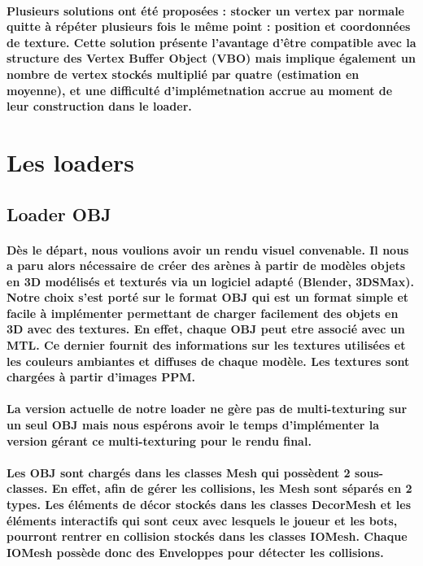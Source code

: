 \paragraph{Plusieurs solutions ont été proposées : stocker un vertex par normale quitte à répéter plusieurs fois le même point : position et coordonnées de texture. Cette solution présente l'avantage d'être compatible avec la structure des Vertex Buffer Object (VBO) mais implique également un nombre de vertex stockés multiplié par quatre (estimation en moyenne), et une difficulté d'implémetnation accrue au moment de leur construction dans le loader.}



\newpage
\section{Les loaders}
\subsection{Loader OBJ}
\vspace{0.5cm}

\paragraph{Dès le départ, nous voulions avoir un rendu visuel convenable. Il nous a paru alors nécessaire de créer des arènes à partir de modèles objets en 3D modélisés et texturés via un logiciel adapté (Blender, 3DSMax). Notre choix s'est porté sur le format OBJ qui est un format simple et facile à implémenter permettant de charger facilement des objets en 3D avec des textures. En effet, chaque OBJ peut etre associé avec un MTL. Ce dernier fournit des informations sur les textures utilisées et les couleurs ambiantes et diffuses de chaque modèle. Les textures sont chargées à partir d'images PPM.}

\paragraph{La version actuelle de notre loader ne gère pas de multi-texturing sur un seul OBJ mais nous espérons avoir le temps d'implémenter la version gérant ce multi-texturing pour le rendu final.}

\paragraph{Les OBJ sont chargés dans les classes Mesh qui possèdent 2 sous-classes. En effet, afin de gérer les collisions, les Mesh sont séparés en 2 types. Les éléments de décor stockés dans les classes DecorMesh et les éléments interactifs qui sont ceux avec lesquels le joueur et les bots, pourront rentrer en collision stockés dans les classes IOMesh. Chaque IOMesh possède donc des Enveloppes pour détecter les collisions.}


